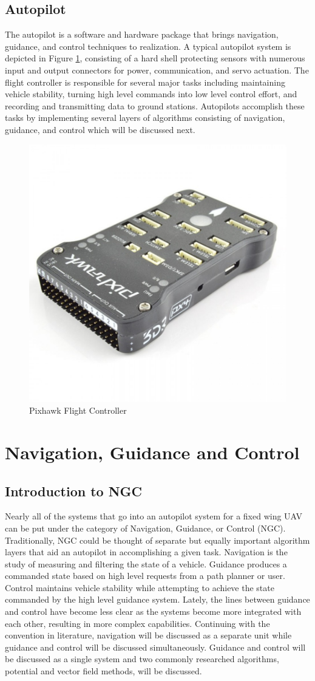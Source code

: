 \documentclass[numbered,pdftex]{ohio-etd}
\begin{document}
\subsection{Autopilot}
The autopilot is a software and hardware package that brings navigation, guidance, and control techniques to realization. A typical autopilot system is depicted in Figure \ref{fig:pixhawk}, consisting of a hard shell protecting sensors with numerous input and output connectors for power, communication, and servo actuation. The flight controller is responsible for several major tasks including maintaining vehicle stability, turning high level commands into low level control effort, and recording and transmitting data to ground stations. Autopilots accomplish these tasks by implementing several layers of algorithms consisting of navigation, guidance, and control which will be discussed next.

\begin{figure}[h]
	\centering
	\includegraphics[width=0.3\linewidth]{PaperFigures/pixhawk}
	\caption{Pixhawk Flight Controller}
	\label{fig:pixhawk}
\end{figure}

\section{Navigation, Guidance and Control} \label{NGC}
\subsection{Introduction to NGC}
Nearly all of the systems that go into an autopilot system for a fixed wing UAV can be put under the category of Navigation, Guidance, or Control (NGC). Traditionally, NGC could be thought of separate but equally important algorithm layers that aid an autopilot in accomplishing a given task. Navigation is the study of measuring and filtering the state of a vehicle. Guidance produces a commanded state based on high level requests from a path planner or user. Control maintains vehicle stability while attempting to achieve the state commanded by the high level guidance system. Lately, the lines between guidance and control have become less clear as the systems become more integrated with each other, resulting in more complex capabilities. Continuing with the convention in literature, navigation will be discussed as a separate unit while guidance and control will be discussed simultaneously. Guidance and control will be discussed as a single system and two commonly researched algorithms, potential and vector field methods, will be discussed.
\end{document}
